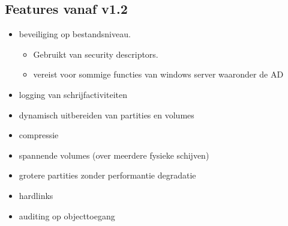 \subsection{Features vanaf v1.2}
\begin{itemize}
\item beveiliging op bestandsniveau.
\begin{itemize}
\item  Gebruikt van security descriptors.
\item vereist voor sommige functies van windows server waaronder de AD
\end{itemize}
\item logging van schrijfactiviteiten
\item dynamisch uitbereiden van partities en volumes
\item compressie
\item spannende volumes (over meerdere fysieke schijven)
\item grotere partities zonder performantie degradatie
\item hardlinks
\item auditing op objecttoegang
\end{itemize}

\clearpage
